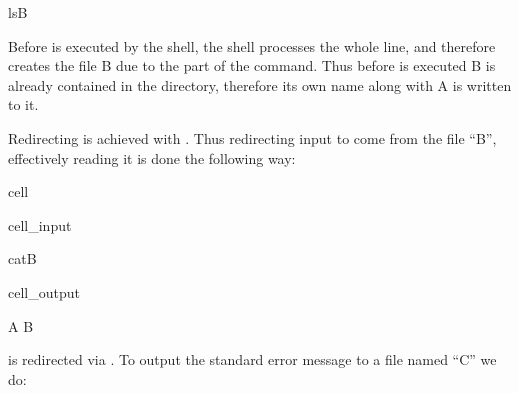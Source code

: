 \documentclass[a4paper,10pt,english]{jupyterBook}
\begin{document}
\begin{sphinxVerbatim}[commandchars=\\\{\}]
ls\PYGZgt{}B
\end{sphinxVerbatim}

\sphinxAtStartPar
Before  is executed by the shell, the shell processes the whole line, and therefore creates the file B due to the  part of the command. Thus before  is executed B is already contained in the directory, therefore its own name along with A is written to it.

\sphinxAtStartPar
Redirecting  is achieved with \sphinxcode{\sphinxupquote{<}}. Thus redirecting input to come from the file “B”, effectively reading it is done the following way:

\begin{sphinxuseclass}{cell}\begin{sphinxVerbatimInput}

\begin{sphinxuseclass}{cell_input}
\begin{sphinxVerbatim}[commandchars=\\\{\}]
cat\PYGZlt{}B
\end{sphinxVerbatim}

\end{sphinxuseclass}\end{sphinxVerbatimInput}
\begin{sphinxVerbatimOutput}

\begin{sphinxuseclass}{cell_output}
\begin{sphinxVerbatim}[commandchars=\\\{\}]
A
B
\end{sphinxVerbatim}

\end{sphinxuseclass}\end{sphinxVerbatimOutput}

\end{sphinxuseclass}
\sphinxAtStartPar
{} is redirected via . To output the standard error message to a file named “C” we do:
\end{document}
